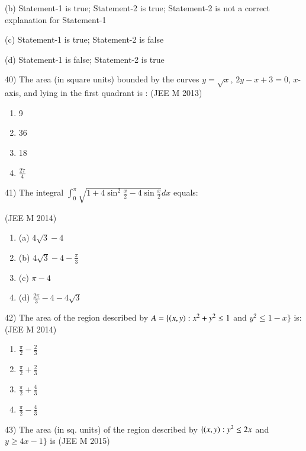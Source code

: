 \documentclass[journal,12pt,twocolumn]{IEEEtran}
\theoremstyle{remark}
\begin{document}
		(b) Statement-1 is true; Statement-2 is true; Statement-2 is not a correct explanation for Statement-1

		(c) Statement-1 is true; Statement-2 is false

		(d) Statement-1 is false; Statement-2 is true

40)
	 The area (in square units) bounded by the curves $y=\sqrt{x}$, $2y-x+3=0$, $x$-axis, and lying in the first quadrant is :
		\hfill{(JEE M 2013)}

		\begin{multicols}{4}
			\begin{enumerate}[label=(\alph*)]
		\item 9
		\item 36
		\item 18
		\item $\frac{27}{4}$
			\end{enumerate}
		\end{multicols}


41)
	 The integral $\int_0^{\pi}\sqrt{1+4\sin ^2\frac{x}{2}-4\sin \frac{x}{2}}dx$ equals:

		\hfill{(JEE M 2014)}

		\begin{multicols}{2}
			\begin{enumerate}[label=(\alph*)]
				\item (a) $4\sqrt{3}-4$
				\item (b) $4\sqrt{3}-4-\frac{\pi}{3}$
				\item (c) $\pi-4$
				\item (d) $\frac{2\pi}{3}-4-4\sqrt{3}$
			\end{enumerate}
		\end{multicols}

42)
	 The area of the region described by $A=\{\left(x,y\right):x^2+y^2\leq1$ and $y^2\leq1-x\}$ is:
		\hfill{(JEE M 2014)}

		\begin{multicols}{4}
			\begin{enumerate}[label=(\alph*)]
				\item $\frac{\pi}{2}-\frac{2}{3}$
				\item $\frac{\pi}{2}+\frac{2}{3}$
				\item $\frac{\pi}{2}+\frac{4}{3}$
				\item $\frac{\pi}{2}-\frac{4}{3}$
			\end{enumerate}
		\end{multicols}

43)
	 The area (in sq. units) of the region described by $\{\left(x,y\right):y^2\leq2x$ and $y\geq4x-1\}$ is
		\hfill{(JEE M 2015)}
\end{document}
